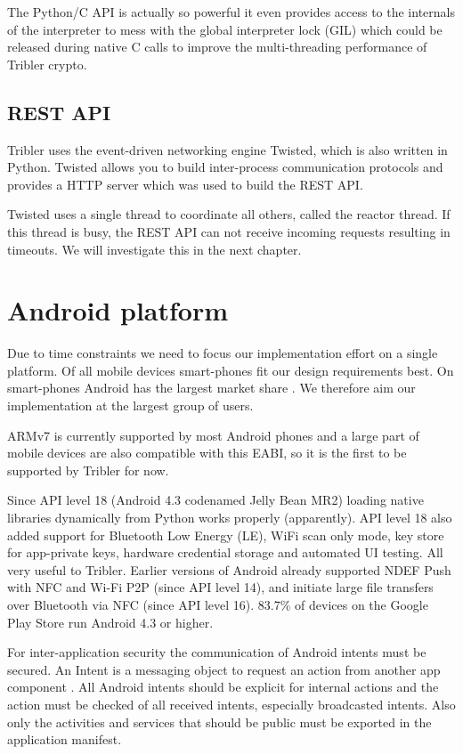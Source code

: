 The Python/C API is actually so powerful it even provides access to the internals of the interpreter to mess with the global interpreter lock (GIL) which could be released during native C calls to improve the multi-threading performance of Tribler crypto.


\subsection{REST API}
Tribler uses the event-driven networking engine Twisted, which is also written in Python.
Twisted allows you to build inter-process communication protocols and provides a HTTP server which was used to build the REST API.

Twisted uses a single thread to coordinate all others, called the reactor thread.
If this thread is busy, the REST API can not receive incoming requests resulting in timeouts.
We will investigate this in the next chapter.


\section{Android platform}
Due to time constraints we need to focus our implementation effort on a single platform.
Of all mobile devices smart-phones fit our design requirements best.
On smart-phones Android has the largest market share \cite{https://www.statista.com/statistics/266136/global-market-share-held-by-smartphone-operating-systems/}.
We therefore aim our implementation at the largest group of users.

ARMv7 is currently supported by most Android phones and a large part of mobile devices are also compatible with this EABI, so it is the first to be supported by Tribler for now.

Since API level 18 (Android 4.3 codenamed Jelly Bean MR2) loading native libraries dynamically from Python works properly (apparently).
API level 18 also added support for Bluetooth Low Energy (LE), WiFi scan only mode, key store for app-private keys, hardware credential storage and automated UI testing.
All very useful to Tribler.
Earlier versions of Android already supported NDEF Push with NFC and Wi-Fi P2P (since API level 14), and initiate large file transfers over Bluetooth via NFC (since API level 16).
83.7\% of devices on the Google Play Store run Android 4.3 or higher.


For inter-application security the communication of Android intents must be secured.
An Intent is a messaging object to request an action from another app component \cite{android-intents}.
All Android intents should be explicit for internal actions and the action must be checked of all received intents, especially broadcasted intents. \cite{paper Analysing inter-application communication in Android}
Also only the activities and services that should be public must be exported in the application manifest.


